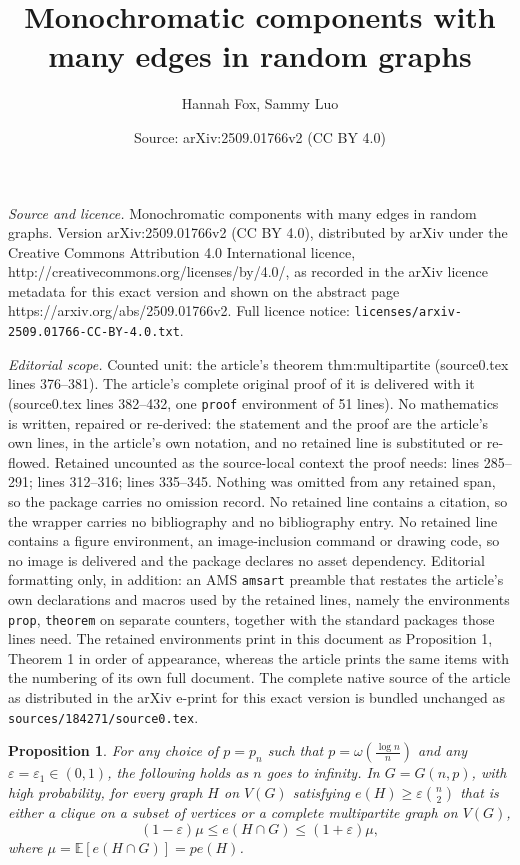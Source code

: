 \documentclass[10pt,a4paper]{amsart}
\title{Monochromatic components with many edges in random graphs}
\author{Hannah Fox, Sammy Luo}
\date{Source: arXiv:2509.01766v2 (CC BY 4.0)}
\newtheorem{prop}{Proposition}
\newcommand{\EE}{\mathbb{E}}
\begin{document}
\maketitle

\noindent\emph{Source and licence.} Monochromatic components with many edges in random graphs. Version arXiv:2509.01766v2 (CC BY 4.0), distributed by arXiv under the Creative Commons Attribution 4.0 International licence, http://creativecommons.org/licenses/by/4.0/, as recorded in the arXiv licence metadata for this exact version and shown on the abstract page https://arxiv.org/abs/2509.01766v2. Full licence notice: \texttt{licenses/arxiv-2509.01766-CC-BY-4.0.txt}.\par\smallskip

\noindent\textit{Editorial scope.} Counted unit: the article's theorem thm:multipartite (source0.tex lines 376--381). The article's complete original proof of it is delivered with it (source0.tex lines 382--432, one \texttt{proof} environment of 51 lines). No mathematics is written, repaired or re-derived: the statement and the proof are the article's own lines, in the article's own notation, and no retained line is substituted or re-flowed.  Retained uncounted as the source-local context the proof needs: lines 285--291; lines 312--316; lines 335--345.  Nothing was omitted from any retained span, so the package carries no omission record.  No retained line contains a citation, so the wrapper carries no bibliography and no bibliography entry.  No retained line contains a figure environment, an image-inclusion command or drawing code, so no image is delivered and the package declares no asset dependency.  Editorial formatting only, in addition: an AMS \texttt{amsart} preamble that restates the article's own declarations and macros used by the retained lines, namely the environments \texttt{prop}, \texttt{theorem} on separate counters, together with the standard packages those lines need.  The retained environments print in this document as Proposition 1, Theorem 1 in order of appearance, whereas the article prints the same items with the numbering of its own full document.  The complete native source of the article as distributed in the arXiv e-print for this exact version is bundled unchanged as \texttt{sources/184271/source0.tex}.
\begin{prop}
    \label{prop:density-control}
    For any choice of $p=p_n$ such that $p=\omega(\frac{\log n}{n})$ and any $\varepsilon=\varepsilon_1\in (0,1)$, the following holds as $n$ goes to infinity. 
     In $G=G(n, p)$, with high probability, for every graph $H$ on $V(G)$ satisfying $e(H)\ge \varepsilon \binom{n}{2}$ that is either a clique on a subset of vertices or a complete multipartite graph on $V(G)$,
    \[(1-\varepsilon)\mu \le e(H\cap G) \le (1+\varepsilon)\mu,\]
    where $\mu=\EE[e(H\cap G)]=pe(H)$.
\end{prop}
\end{document}
